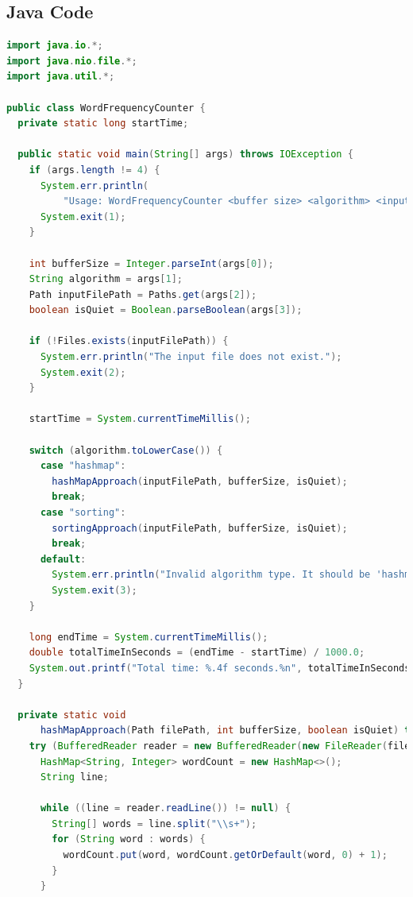 \documentclass{article}
\begin{document}
  \subsection{Java Code}
  \begin{lstlisting}[language=Java, 
    basicstyle=\ttfamily\scriptsize, 
    numbers=none, 
    frame=single,
    showspaces=false,
    caption={Source Code for the WordFrequencyCounter.java file.}]
import java.io.*;
import java.nio.file.*;
import java.util.*;

public class WordFrequencyCounter {
  private static long startTime;

  public static void main(String[] args) throws IOException {
    if (args.length != 4) {
      System.err.println(
          "Usage: WordFrequencyCounter <buffer size> <algorithm> <input file> <quiet flag>");
      System.exit(1);
    }

    int bufferSize = Integer.parseInt(args[0]);
    String algorithm = args[1];
    Path inputFilePath = Paths.get(args[2]);
    boolean isQuiet = Boolean.parseBoolean(args[3]);

    if (!Files.exists(inputFilePath)) {
      System.err.println("The input file does not exist.");
      System.exit(2);
    }

    startTime = System.currentTimeMillis();

    switch (algorithm.toLowerCase()) {
      case "hashmap":
        hashMapApproach(inputFilePath, bufferSize, isQuiet);
        break;
      case "sorting":
        sortingApproach(inputFilePath, bufferSize, isQuiet);
        break;
      default:
        System.err.println("Invalid algorithm type. It should be 'hashmap' or 'sorting'.");
        System.exit(3);
    }

    long endTime = System.currentTimeMillis();
    double totalTimeInSeconds = (endTime - startTime) / 1000.0;
    System.out.printf("Total time: %.4f seconds.%n", totalTimeInSeconds);
  }

  private static void
      hashMapApproach(Path filePath, int bufferSize, boolean isQuiet) throws IOException {
    try (BufferedReader reader = new BufferedReader(new FileReader(filePath.toFile()), bufferSize)) {
      HashMap<String, Integer> wordCount = new HashMap<>();
      String line;

      while ((line = reader.readLine()) != null) {
        String[] words = line.split("\\s+");
        for (String word : words) {
          wordCount.put(word, wordCount.getOrDefault(word, 0) + 1);
        }
      }


\end{lstlisting}
\end{document}
